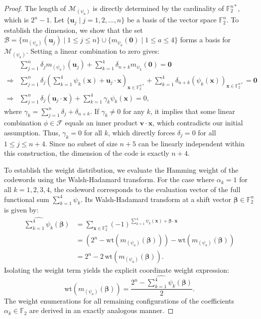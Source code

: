 \documentclass[10pt,a4paper]{amsart}
\begin{document}
\begin{proof}
The length of $\mathcal{M}_{(\psi_a)}$ is directly determined by the cardinality of $\mathbb{F}_2^{n*}$, which is $2^n - 1$. Let $\{\mathbf{u}_j \mid j = 1,2,\ldots,n\}$ be a basis of the vector space $\mathbb{F}_2^n$. To establish the dimension, we show that the set $\mathcal{B} = \{m_{(\psi_a)}(\mathbf{u}_j) \mid 1 \leq j \leq n\} \cup \{m_{\psi_a}(\mathbf{0}) \mid 1 \leq a \leq 4\}$ forms a basis for $\mathcal{M}_{(\psi_a)}$. Setting a linear combination to zero gives:
\begin{align*}
&\sum_{j=1}^{n} \delta_j m_{(\psi_a)}(\mathbf{u}_j) + \sum_{k=1}^{4} \delta_{n+k} m_{\psi_k}(\mathbf{0}) = \mathbf{0}\\
\Rightarrow & \sum_{j=1}^{n} \delta_j 
\left(
\sum_{k=1}^{4} \psi_k(\mathbf{x}) + \mathbf{u}_j \cdot \mathbf{x}
\right)_{\mathbf{x} \in \mathbb{F}_2^{n*}}
+ \sum_{k=1}^{4} \delta_{n+k} (\psi_k(\mathbf{x}))_{\mathbf{x} \in \mathbb{F}_2^{n*}} = \mathbf{0}\\
\Rightarrow &\sum_{j=1}^{n} \delta_j (\mathbf{u}_j \cdot \mathbf{x}) + \sum_{k=1}^{4} \gamma_k \psi_k(\mathbf{x}) = 0, 
\end{align*}
where $\gamma_k = \sum_{j=1}^{n} \delta_j + \delta_{n+k}$. If $\gamma_k \neq 0$ for any $k$, it implies that some linear combination $\phi \in \mathcal{F}$ equals an inner product $\mathbf{v} \cdot \mathbf{x}$, which contradicts our initial assumption. Thus, $\gamma_k = 0$ for all $k$, which directly forces $\delta_j = 0$ for all $1 \leq j \leq n+4$. Since no subset of size $n+5$ can be linearly independent within this construction, the dimension of the code is exactly $n+4$. 

To establish the weight distribution, we evaluate the Hamming weight of the codewords using the Walsh-Hadamard transform. For the case where $\alpha_k = 1$ for all $k = 1,2,3,4$, the codeword corresponds to the evaluation vector of the full functional sum $\sum_{k=1}^{4} \psi_k$. Its Walsh-Hadamard transform at a shift vector $\mathbf{\beta} \in \mathbb{F}_2^n$ is given by:
\begin{align*}
\widehat{\sum_{k=1}^{4} \psi_k}(\mathbf{\beta}) 
&= \sum_{\mathbf{x} \in \mathbb{F}_2^n} (-1)^{\sum_{k=1}^{4} \psi_k(\mathbf{x}) + \mathbf{\beta} \cdot \mathbf{x}} \\
&= \left(2^n - \mathrm{wt}(m_{(\psi_a)}(\mathbf{\beta}))\right) - \mathrm{wt}(m_{(\psi_a)}(\mathbf{\beta})) \\
&= 2^n - 2\,\mathrm{wt}(m_{(\psi_a)}(\mathbf{\beta})).
\end{align*}
Isolating the weight term yields the explicit coordinate weight expression:
\[
\mathrm{wt}(m_{(\psi_a)}(\mathbf{\beta})) = \frac{2^n - \widehat{\sum_{k=1}^{4} \psi_k}(\mathbf{\beta})}{2}.
\]
The weight enumerations for all remaining configurations of the coefficients $\alpha_k \in \mathbb{F}_2$ are derived in an exactly analogous manner.
\end{proof}
\end{document}
